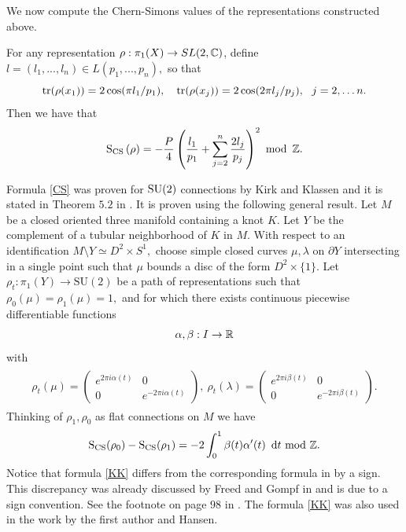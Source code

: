We now compute the Chern-Simons values of the representations constructed above. 
\begin{proposition} \label{CSvalues}  For any representation $\rho : \pi_1(X) \rightarrow SL(2,\mathbb{C})$, define $l=(l_1,...,l_n) \in L(p_1,...,p_n),$ so that
$$ \operatorname{tr}(\rho(x_1)) = 2\cos(\pi l_1/p_1), \ \ \ \operatorname{tr}(\rho(x_j)) = 2\cos(2\pi l_j/p_j), \ \ j = 2, \ldots n.$$
Then we have that
\begin{equation} \label{CS}
\operatorname{S_{CS}}\left( \rho \right) = -\frac{P}{4}\left(\frac{l_1}{p_1}+\sum_{j=2}^{n} \frac{2l_j}{p_j}\right)^2 \  \operatorname{mod} \ \mathbb{Z}.
\end{equation}
\end{proposition}
Formula \eqref{CS} was proven for $\operatorname{SU}(2)$ connections by Kirk and Klassen and it is stated in Theorem $5.2$ in \cite{KirkKlassen90}. It is proven using the following general result.
Let $M$ be a closed oriented three manifold containing a knot $K.$ Let $Y$ be the complement of a tubular neighborhood of $K$ in $M.$ With respect to an identification $M\setminus Y \simeq D^2 \times S^1,$ choose simple closed curves $\mu, \lambda$ on $\partial Y$ intersecting in a single point such that $\mu$ bounds a disc of the form $D^2 \times \{1\}.$ Let $\rho_t:\pi_1(Y) \rightarrow \text{SU}(2)$ be a path of representations such that $\rho_0(\mu)=\rho_1(\mu)=1,$ and for which there exists continuous piecewise differentiable functions 
$$\alpha,\beta:I \rightarrow \mathbb{R}$$ 
with 
\begin{align}
\begin{split}
\rho_t(\mu)= \begin{pmatrix} e^{2\pi i \alpha(t)} & 0
\\ 0 &  e^{-2\pi i \alpha(t)} \end{pmatrix}, \  \rho_t(\lambda)=\begin{pmatrix} e^{2\pi i \beta(t)} & 0
\\ 0 &  e^{-2\pi i \beta(t)} \end{pmatrix}.
\end{split}
\end{align}
Thinking of $\rho_1,\rho_0$ as flat connections on $M$ we have
\begin{equation} \label{KK}
\s(\rho_0)-\s(\rho_1)=-2 \int_0^1 \beta(t) \alpha'(t) \ \dv t \ \text{mod} \ \mathbb{Z}. 
\end{equation}
Notice that formula \eqref{KK} differs from the corresponding formula in \cite{KirkKlassen90} by a sign. This discrepancy was already discussed by Freed and Gompf in \cite{FreedGompf91} and is due to a sign convention. See the footnote on page $98$ in \cite{FreedGompf91}. The formula \eqref{KK} was also used in the work \cite{AndersenHansen} by the first author and Hansen. 

